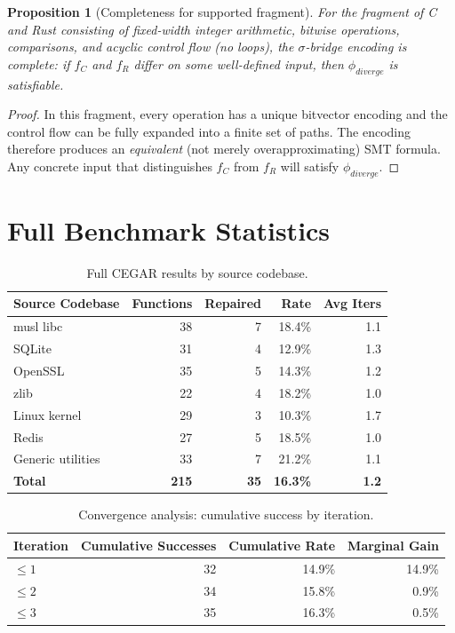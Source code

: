 \documentclass[10pt,letterpaper]{article}
\newtheorem{proposition}[theorem]{Proposition}
\begin{document}
\begin{proposition}[Completeness for supported fragment]
\label{prop:completeness}
For the fragment of C and Rust consisting of fixed-width integer arithmetic,
bitwise operations, comparisons, and acyclic control flow (no loops), the
$\sigma$-bridge encoding is complete: if $f_C$ and $f_R$ differ on some
well-defined input, then $\phi_{\mathit{diverge}}$ is satisfiable.
\end{proposition}

\begin{proof}
In this fragment, every operation has a unique bitvector encoding and the
control flow can be fully expanded into a finite set of paths. The encoding
therefore produces an \emph{equivalent} (not merely overapproximating) SMT formula.
Any concrete input that distinguishes $f_C$ from $f_R$ will satisfy
$\phi_{\mathit{diverge}}$.
\end{proof}

\section{Full Benchmark Statistics}
\label{app:benchmark}

\begin{table}[h]
\centering
\caption{Full CEGAR results by source codebase.}
\label{tab:fullbench}
\small
\begin{tabular}{@{}lrrrr@{}}
\toprule
\textbf{Source Codebase} & \textbf{Functions} & \textbf{Repaired} & \textbf{Rate} & \textbf{Avg Iters} \\
\midrule
musl libc & 38 & 7 & 18.4\% & 1.1 \\
SQLite & 31 & 4 & 12.9\% & 1.3 \\
OpenSSL & 35 & 5 & 14.3\% & 1.2 \\
zlib & 22 & 4 & 18.2\% & 1.0 \\
Linux kernel & 29 & 3 & 10.3\% & 1.7 \\
Redis & 27 & 5 & 18.5\% & 1.0 \\
Generic utilities & 33 & 7 & 21.2\% & 1.1 \\
\midrule
\textbf{Total} & \textbf{215} & \textbf{35} & \textbf{16.3\%} & \textbf{1.2} \\
\bottomrule
\end{tabular}
\end{table}

\begin{table}[h]
\centering
\caption{Convergence analysis: cumulative success by iteration.}
\label{tab:convergence}
\begin{tabular}{@{}lrrr@{}}
\toprule
\textbf{Iteration} & \textbf{Cumulative Successes} & \textbf{Cumulative Rate} & \textbf{Marginal Gain} \\
\midrule
$\leq 1$ & 32 & 14.9\% & 14.9\% \\
$\leq 2$ & 34 & 15.8\% & 0.9\% \\
$\leq 3$ & 35 & 16.3\% & 0.5\% \\
\bottomrule
\end{tabular}
\end{table}
\end{document}
